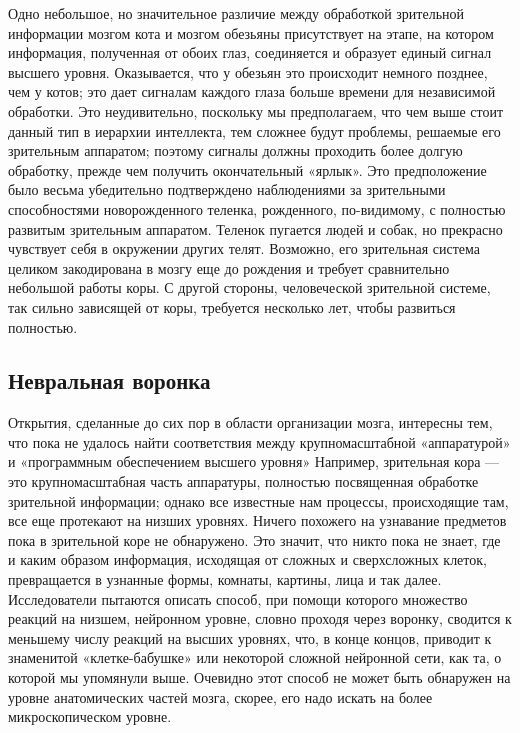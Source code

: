 \documentclass[../main.tex]{subfiles}
\begin{document}
Одно небольшое, но значительное различие между обработкой зрительной информации мозгом кота и мозгом обезьяны присутствует на этапе, на котором информация, полученная от обоих глаз, соединяется и образует единый сигнал высшего уровня. Оказывается, что у обезьян это происходит немного позднее, чем у котов; это дает сигналам каждого глаза больше времени для независимой обработки. Это неудивительно, поскольку мы предполагаем, что чем выше стоит данный тип в иерархии интеллекта, тем сложнее будут проблемы, решаемые его зрительным аппаратом; поэтому сигналы должны проходить более долгую обработку, прежде чем получить окончательный «ярлык». Это предположение было весьма убедительно подтверждено наблюдениями за зрительными способностями новорожденного теленка, рожденного, по-видимому, с полностью развитым зрительным аппаратом. Теленок пугается людей и собак, но прекрасно чувствует себя в окружении других телят. Возможно, его зрительная система целиком закодирована в мозгу еще до рождения и требует сравнительно небольшой работы коры. С другой стороны, человеческой зрительной системе, так сильно зависящей от коры, требуется несколько лет, чтобы развиться полностью.

\subsection{Невральная воронка}

Открытия, сделанные до сих пор в области организации мозга, интересны тем, что пока не удалось найти соответствия между крупномасштабной «аппаратурой» и «программным обеспечением высшего уровня» Например, зрительная кора --- это крупномасштабная часть аппаратуры, полностью посвященная обработке зрительной информации; однако все известные нам процессы, происходящие там, все еще протекают на низших уровнях. Ничего похожего на узнавание предметов пока в зрительной коре не обнаружено. Это значит, что никто пока не знает, где и каким образом информация, исходящая от сложных и сверхсложных клеток, превращается в узнанные формы, комнаты, картины, лица и так далее. Исследователи пытаются описать способ, при помощи которого множество реакций на низшем, нейронном уровне, словно проходя через воронку, сводится к меньшему числу реакций на высших уровнях, что, в конце концов, приводит к знаменитой «клетке-бабушке» или некоторой сложной нейронной сети, как та, о которой мы упомянули выше. Очевидно этот способ не может быть обнаружен на уровне анатомических частей мозга, скорее, его надо искать на более микроскопическом уровне.
\end{document}
